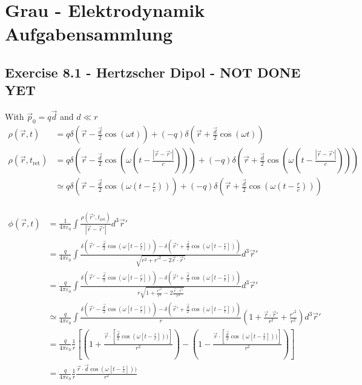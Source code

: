 \documentclass[../main.tex]{subfiles}
\begin{document}
\section{{\sc Grau} - Elektrodynamik Aufgabensammlung}
\subsection{Exercise 8.1 - Hertzscher Dipol - NOT DONE YET}
With $\vec{p}_0=q\vec{d}$ and $d\ll r$
\begin{align}
\rho(\vec{r},t)
&=
q\delta(\vec{r}-\frac{\vec{d}}{2} \cos(\omega t))+
(-q)\delta(\vec{r}+\frac{\vec{d}}{2} \cos(\omega t))\\
\rho(\vec{r},t_\text{ret})
&=
q\delta(\vec{r}-\frac{\vec{d}}{2} \cos(\omega (t-\frac{|\vec{r}-\vec{r}'|}{c})))+
(-q)\delta(\vec{r}+\frac{\vec{d}}{2} \cos(\omega (t-\frac{|\vec{r}-\vec{r}'|}{c})))\\
&\simeq
q\delta(\vec{r}-\frac{\vec{d}}{2} \cos(\omega (t-\frac{r}{c})))+
(-q)\delta(\vec{r}+\frac{\vec{d}}{2} \cos(\omega (t-\frac{r}{c})))\\
\end{align}

\begin{align}
\phi(\vec{r},t)
&=\frac{1}{4\pi\varepsilon_0}\int\frac{\rho(\vec{r}',t_\text{ret})}{|\vec{r}-\vec{r}'|}d^3\vec{r}'\\
&=\frac{q}{4\pi\varepsilon_0}\int\frac{\delta(\vec{r}'-\frac{\vec{d}}{2}\cos(\omega [t-\frac{r}{c}]))-\delta(\vec{r}'+\frac{\vec{d}}{2}\cos(\omega [t-\frac{r}{c}]))}{\sqrt{r^2+r'^2-2\vec{r}\cdot\vec{r}'}}d^3\vec{r}'\\
&=\frac{q}{4\pi\varepsilon_0}\int\frac{\delta(\vec{r}'-\frac{\vec{d}}{2}\cos(\omega [t-\frac{r}{c}]))-\delta(\vec{r}'+\frac{\vec{d}}{2}\cos(\omega [t-\frac{r}{c}]))}{r\sqrt{1+\frac{r'^2}{r^2}-2\frac{\vec{r}\cdot\vec{r}'}{r^2}}}d^3\vec{r}'\\
&\simeq\frac{q}{4\pi\varepsilon_0}\int\frac{\delta(\vec{r}'-\frac{\vec{d}}{2}\cos(\omega [t-\frac{r}{c}]))-\delta(\vec{r}'+\frac{\vec{d}}{2}\cos(\omega [t-\frac{r}{c}]))}{r}\left(1+\frac{\vec{r}\cdot\vec{r}'}{r^2}+\frac{r'^2}{r^2}\right)d^3\vec{r}'\\
&=\frac{q}{4\pi\varepsilon_0}\frac{1}{r}\left[\left(1+\frac{\vec{r}\cdot\left[\frac{\vec{d}}{2}\cos(\omega [t-\frac{r}{c}]))\right]}{r^2}\right)-\left(1-\frac{\vec{r}\cdot\left[\frac{\vec{d}}{2}\cos(\omega [t-\frac{r}{c}]))\right]}{r^2}\right)\right]\\
&=\frac{q}{4\pi\varepsilon_0}\frac{1}{r} \frac{\vec{r}\cdot\vec{d}\cos(\omega [t-\frac{r}{c}]))}{r^2}\\
\end{align}
\end{document}
